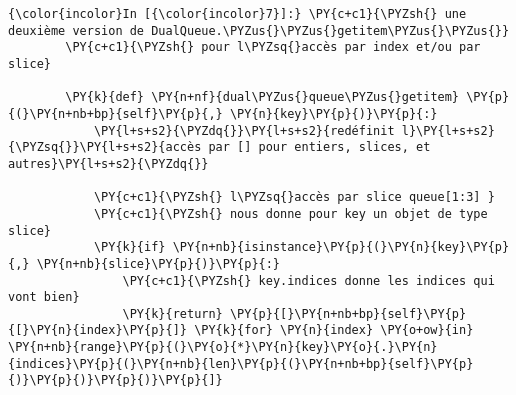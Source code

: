     \begin{Verbatim}[commandchars=\\\{\},frame=single,framerule=0.3mm,rulecolor=\color{cellframecolor}]
{\color{incolor}In [{\color{incolor}7}]:} \PY{c+c1}{\PYZsh{} une deuxième version de DualQueue.\PYZus{}\PYZus{}getitem\PYZus{}\PYZus{}}
        \PY{c+c1}{\PYZsh{} pour l\PYZsq{}accès par index et/ou par slice}
        
        \PY{k}{def} \PY{n+nf}{dual\PYZus{}queue\PYZus{}getitem} \PY{p}{(}\PY{n+nb+bp}{self}\PY{p}{,} \PY{n}{key}\PY{p}{)}\PY{p}{:}
            \PY{l+s+s2}{\PYZdq{}}\PY{l+s+s2}{redéfinit l}\PY{l+s+s2}{\PYZsq{}}\PY{l+s+s2}{accès par [] pour entiers, slices, et autres}\PY{l+s+s2}{\PYZdq{}}
        
            \PY{c+c1}{\PYZsh{} l\PYZsq{}accès par slice queue[1:3] }
            \PY{c+c1}{\PYZsh{} nous donne pour key un objet de type slice}
            \PY{k}{if} \PY{n+nb}{isinstance}\PY{p}{(}\PY{n}{key}\PY{p}{,} \PY{n+nb}{slice}\PY{p}{)}\PY{p}{:}
                \PY{c+c1}{\PYZsh{} key.indices donne les indices qui vont bien}
                \PY{k}{return} \PY{p}{[}\PY{n+nb+bp}{self}\PY{p}{[}\PY{n}{index}\PY{p}{]} \PY{k}{for} \PY{n}{index} \PY{o+ow}{in} \PY{n+nb}{range}\PY{p}{(}\PY{o}{*}\PY{n}{key}\PY{o}{.}\PY{n}{indices}\PY{p}{(}\PY{n+nb}{len}\PY{p}{(}\PY{n+nb+bp}{self}\PY{p}{)}\PY{p}{)}\PY{p}{)}\PY{p}{]}
        

\end{Verbatim}
